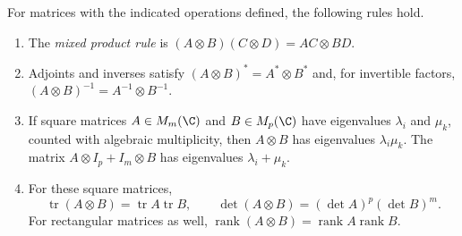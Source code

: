 \begin{proposition}\label{linear:prop:kronecker}
For matrices with the indicated operations defined, the following rules hold.
\begin{enumerate}[label=(\roman*)]
\item The \emph{mixed product rule} is $(A\otimes B)(C\otimes D)=AC\otimes BD$.
\item Adjoints and inverses satisfy $(A\otimes B)^*=A^*\otimes B^*$ and, for invertible factors, $(A\otimes B)^{-1}=A^{-1}\otimes B^{-1}$.
\item If square matrices $A\in M_m(\C)$ and $B\in M_p(\C)$ have eigenvalues $\lambda_i$ and $\mu_k$, counted with algebraic multiplicity, then $A\otimes B$ has eigenvalues $\lambda_i\mu_k$. The matrix $A\otimes I_p+I_m\otimes B$ has eigenvalues $\lambda_i+\mu_k$.
\item For these square matrices,
\[
\operatorname{tr}(A\otimes B)=\operatorname{tr}A\operatorname{tr}B,
\qquad
\det(A\otimes B)=(\det A)^p(\det B)^m.
\]
For rectangular matrices as well,
$\operatorname{rank}(A\otimes B)=\operatorname{rank}A\operatorname{rank}B$.
\end{enumerate}
\end{proposition}
